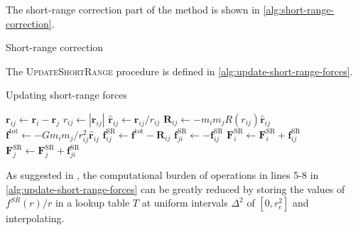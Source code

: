 The short-range correction part of the \PThreeM{} method is shown in \autoref{alg:short-range-correction}.
\begin{algorithm}
    \caption{Short-range correction}\label{alg:short-range-correction}
    \begin{algorithmic}
        \Break
        \EndIf
        \State {}
        \EndFor
        \EndFor
        \EndFor
        \EndFor
    \end{algorithmic}
\end{algorithm}
The \textsc{UpdateShortRange} procedure is defined in \autoref{alg:update-short-range-forces}.
\begin{algorithm}
    \caption{Updating short-range forces}\label{alg:update-short-range-forces}
    \begin{algorithmic}[1]
        \Return
        \EndIf
        \State $\mathbf{r}_{ij} \gets \mathbf{r}_i - \mathbf{r}_j$
        \Return
        \EndIf
        \State $r_{ij} \gets |\mathbf{r}_{ij}|$
        \State $\hat{\mathbf{r}}_{ij} \gets \mathbf{r}_{ij} / r_{ij}$
        \State $\mathbf{R}_{ij} \gets -m_i m_j R(r_{ij}) \hat{\mathbf{r}}_{ij}$
        \State $\mathbf{f}^\text{tot} \gets -G m_i m_j / r_{ij}^2 \hat{\mathbf{r}}_{ij}$
        \State $\mathbf{f}^\text{SR}_{ij} \gets \mathbf{f}^\text{tot} - \mathbf{R}_{ij}$
        \State $\mathbf{f}^\text{SR}_{ji} \gets -\mathbf{f}^\text{SR}_{ij}$
        \State $\mathbf{F}^\text{SR}_i \gets \mathbf{F}^\text{SR}_i + \mathbf{f}^\text{SR}_{ij}$
         
        \State $\mathbf{F}^\text{SR}_j \gets \mathbf{F}^\text{SR}_j + \mathbf{f}^\text{SR}_{ji}$
        \EndIf
        \EndProcedure
    \end{algorithmic}
\end{algorithm}
As suggested in \cite{Hockney1988}, the computational burden of operations in lines 5-8 in \autoref{alg:update-short-range-forces} can be greatly reduced by storing the values of $f^{SR}(r) / r$ in a lookup table $T$ at uniform intervals $\Delta^2$ of $[0, r_e^2]$ and interpolating.
